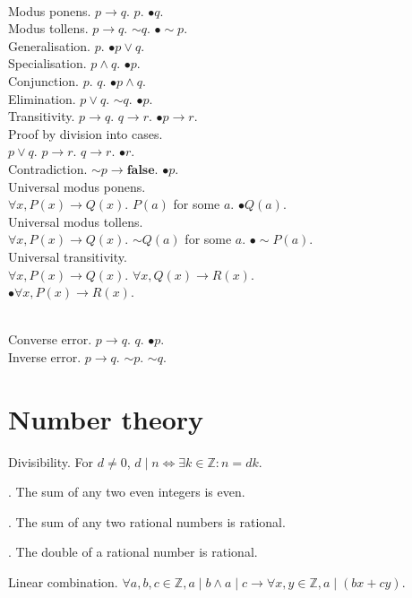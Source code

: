 \documentclass{slnotes}
\newcommand{\slnot}{\mathop{\sim}}
\begin{document}
\\
Modus ponens. \(p \to q\). \(p\). \(\bullet q\).\\
Modus tollens. \(p \to q\). \(\slnot q\). \(\bullet \slnot p\).\\
Generalisation. \(p\). \(\bullet p \lor q\).\\
Specialisation. \(p \land q\). \(\bullet p\).\\
Conjunction. \(p\). \(q\). \(\bullet p \land q\).\\
Elimination. \(p \lor q\). \(\slnot q\). \(\bullet p\).\\
Transitivity. \(p \to q\). \(q \to r\). \(\bullet p \to r\).\\
Proof by division into cases.\\\(p \lor q\). \(p \to r\). \(q \to r\). \(\bullet r\).\\
Contradiction. \(\slnot p \to \mathbf{false}\). \(\bullet p\).\\
Universal modus ponens.\\\(\forall x, P(x) \to Q(x)\). \(P(a)\) for some \(a\). \(\bullet Q(a)\).\\
Universal modus tollens.\\\(\forall x, P(x) \to Q(x)\). \(\slnot Q(a)\) for some \(a\). \(\bullet \slnot P(a)\).\\
Universal transitivity.\\\(\forall x, P(x) \to Q(x)\). \(\forall x, Q(x) \to R(x)\).\\\(\bullet \forall x, P(x) \to R(x)\).

\\
Converse error. \(p \to q\). \(q\). \(\bullet p\).\\
Inverse error. \(p \to q\). \(\slnot p\). \(\slnot q\).

\chapter{Number theory}
 Divisibility. For \(d \neq 0\), \(d \mid n \Leftrightarrow \exists k \in \mathbb{Z} : n = dk\).

. The sum of any two even integers is even.

. The sum of any two rational numbers is rational.

. The double of a rational number is rational.

 Linear combination. \(\forall a, b, c \in \mathbb{Z}, a \mid b \land a \mid c \to \forall x,y \in \mathbb{Z}, a \mid (bx + cy)\).
\end{document}
